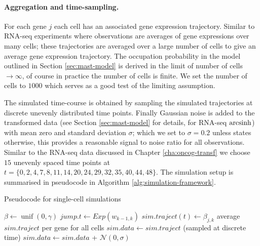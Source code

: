 \paragraph{Aggregation and time-sampling.}
\label{sec:aggr-time-sampl}
For each gene $j$ each cell has an associated gene expression trajectory. Similar to RNA-seq experiments where observations are averages of gene expressions over many cells; these trajectories are averaged over a large number of cells to give an average gene expression trajectory. The occupation probability in the model outlined in Section \ref{sec:mast-model} is derived in the limit of number of cells $\rightarrow \infty$, of course in practice the number of cells is finite. We set the number of cells to $1000$ which serves as a good test of the limiting assumption.

The simulated time-course is obtained by sampling the simulated trajectories at discrete unevenly distributed time points. Finally Gaussian noise is added to the transformed data (see Section \ref{sec:mast-model} for details, for RNA-seq $\operatorname{arcsinh}$) with mean zero and standard deviation $\sigma$; which we set to $\sigma=0.2$ unless states otherwise, this provides a reasonable signal to noise ratio for all observations. Similar to the RNA-seq data discussed in Chapter \ref{cha:oncog-transf} we choose $15$ unevenly spaced  time points at $t=\lbrace 0,  2,  4,  7,  8, 11, 14, 20, 24, 29, 32, 35, 40, 44, 48\rbrace$. The simulation setup is summarised in pseudocode in Algorithm \ref{alg:simulation-framework}.


\begin{algorithm}
    \caption{Pseudocode for single-cell simulations}\label{alg:simulation-framework}
    \begin{algorithmic}[0]
        \State $\beta \gets \operatorname{unif}(0, \gamma)$
        \State $jump.t \gets Exp(w_{k-1,k})$
        \State $sim.traject(t) \gets \beta_{j,k}$
        \EndWhile
        \EndFor
        \EndFor
        \EndFor
        \State average $sim.traject$ per gene for all cells
        \State $sim.data \gets sim.traject$ (sampled at discrete time)
        \State $sim.data \gets sim.data$ + $\mathcal{N}(0, \sigma)$
        \EndProcedure
      \end{algorithmic}
\end{algorithm}

